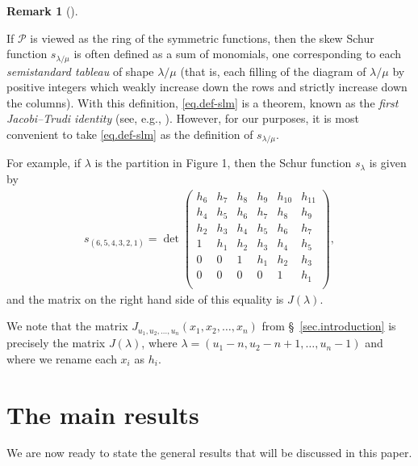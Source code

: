 \documentclass[numbers=enddot,12pt,final,onecolumn,notitlepage]{scrartcl}%
\theoremstyle{definition}
\newtheorem{remk}[theo]{Remark}
\newenvironment{remark}[1][]
{\begin{remk}[#1]\begin{leftbar}}
{\end{leftbar}\end{remk}}
\newcommand{\tup}[1]{\left( #1 \right)}
\theoremstyle{plainsl}
\begin{document}
\begin{remark}
\label{flushremark}
If $\mathcal{P}$ is viewed as the ring of the symmetric functions, then the skew Schur function $s_{\lambda/\mu}$ is often defined as a sum of monomials, one corresponding to each \emph{semistandard tableau} of shape $\lambda / \mu$ (that is, each filling of the diagram of $\lambda/\mu$ by positive integers which weakly increase down the rows and strictly increase down the columns). With this definition, \eqref{eq.def-slm} is a theorem, known as the \emph{first Jacobi--Trudi identity} (see, e.g., \cite[Theorem 7.16.1]{EC2}).
However, for our purposes, it is most convenient to take \eqref{eq.def-slm} as the definition of $s_{\lambda/\mu}$.
\end{remark}

For example, if $\lambda$ is the partition in Figure 1, then the Schur function $s_\lambda$ is given by
\begin{align*}
s_{(6,5,4,3,2,1)} =
\det
\begin{pmatrix}
h_6 & h_7 & h_8 & h_{9} & h_{10}& h_{11} \\ 
h_4 & h_5 & h_6 & h_{7} & h_{8}& h_{9} \\
h_2 & h_3 & h_4 & h_{5} & h_{6}& h_{7} \\
1 & h_1 & h_2 & h_{3} & h_{4}& h_{5} \\
0 & 0 & 1 & h_{1} & h_{2}& h_{3} \\
0 & 0 & 0 & 0 & 1 & h_{1} \\
\end{pmatrix} ,
\end{align*}
and the matrix on the right hand side of this equality is $J\tup{\lambda}$.


We note that the matrix $J_{u_1, u_2, \ldots, u_n}\tup{x_1, x_2, \ldots, x_n}$
from \S~\ref{sec.introduction} is precisely the matrix
$J\tup{\lambda}$, where
$\lambda = \tup{u_1 - n, u_2 - n+1, \ldots, u_n -1}$
and where we rename each $x_i$ as $h_i$.



\section{The main results}

We are now ready to state the general results that will be discussed in this paper.
\end{document}
